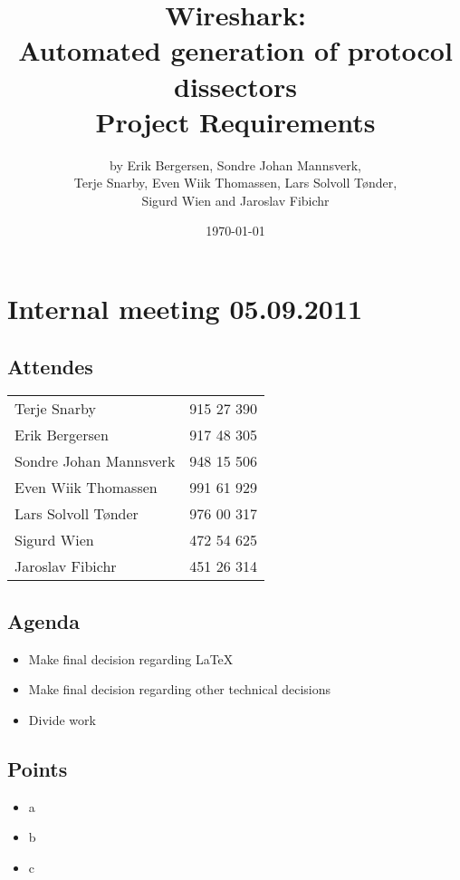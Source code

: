 \documentclass[a4paper, 11pt]{report}
\title{Wireshark:\\ Automated generation of protocol dissectors\\
		Project Requirements}
\author{by Erik Bergersen, Sondre Johan Mannsverk,\\ Terje Snarby,
		Even Wiik Thomassen, Lars Solvoll Tønder,\\ Sigurd Wien
		and Jaroslav Fibichr}
\date{\today}
\begin{document}
\section*{Internal meeting 05.09.2011}

\subsection*{Attendes}

\begin{tabular}{l  l}
	Terje Snarby & 915 27 390 \\
	Erik Bergersen & 917 48 305 \\
	Sondre Johan Mannsverk & 948 15 506 \\
	Even Wiik Thomassen & 991 61 929 \\
	Lars Solvoll Tønder & 976 00 317 \\
	Sigurd Wien & 472 54 625 \\
	Jaroslav Fibichr & 451 26 314 \\
\end{tabular}

\subsection*{Agenda}

\begin{itemize}
	\item Make final decision regarding LaTeX 
	\item Make final decision regarding other technical decisions
	\item Divide work
\end{itemize}

\subsection*{Points}

\begin{itemize}
	\item a
	\item b
	\item c
\end{itemize}
\end{document}
